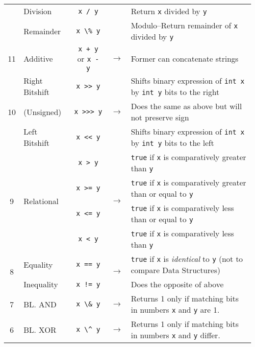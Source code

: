 \documentclass{article}
\begin{document}
\begin{center}
\begin{tabularx}{\textwidth}{clccX}
                      & Division          & \lstinline|x / y| & & Return \lstinline|x| divided by \lstinline|y|\\
                      & Remainder         & \lstinline|x \% y| & & Modulo--Return remainder of \lstinline|x| divided by \lstinline|y|\\\midrule
                  11  & Additive          & \lstinline|x + y| or \lstinline|x - y| & \(\to\) & Former can concatenate strings\\\midrule
  \multirow{3}{*}{10} & Right Bitshift & \lstinline|x >> y| & \multirow{3}{*}{\(\to\)} & Shifts binary expression of \lstinline|int x| by \lstinline|int y| bits to the right\\
                      & (Unsigned) & \lstinline|x >>> y| & & Does the same as above but will not preserve sign\\
                      & Left Bitshift & \lstinline|x << y| & & Shifts binary expression of \lstinline|int x| by \lstinline|int y| bits to the left\\\midrule
  \multirow{4}{*}{9}   & \multirow{4}{*}{Relational}        & \lstinline|x > y| & \multirow{4}{*}{\(\to\)} & \lstinline|true| if \lstinline|x| is comparatively greater than \lstinline|y| \\
                      &                   & \lstinline|x >= y| & & \lstinline|true| if \lstinline|x| is comparatively greater than or equal to \lstinline|y| \\
                      &                   & \lstinline|x <= y| & & \lstinline|true| if \lstinline|x| is comparatively less than or equal to \lstinline|y| \\
                      &                   & \lstinline|x < y| & & \lstinline|true| if \lstinline|x| is comparatively less than \lstinline|y| \\\midrule
  \multirow{2}{*}{8}  & Equality          & \lstinline|x == y|    & \multirow{2}{*}{\(\to\)} & \lstinline|true| if \lstinline|x| is \textit{identical} to \lstinline|y| (not to compare Data Structures)\\
                      & Inequality        & \lstinline|x != y|    &  & Does the opposite of above\\\midrule
                  7   & BL. AND           & \lstinline|x \& y|    & \(\to\) & Returns 1 only if matching bits in numbers \lstinline|x| and \lstinline|y| are 1. \\\midrule
                  6   & BL. XOR           & \lstinline|x \^ y|    & \(\to\) & Returns 1 only if matching bits in numbers \lstinline|x| and \lstinline|y| differ.\\\midrule

\end{tabularx}
\end{center}
\end{document}
